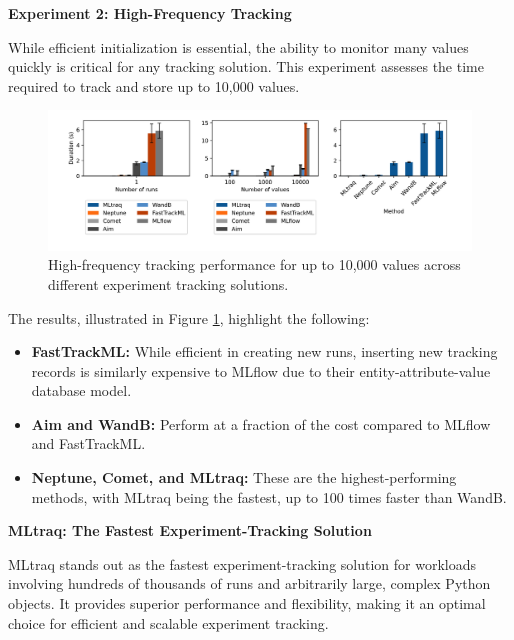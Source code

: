 \textbf{Experiment 2: High-Frequency Tracking}

While efficient initialization is essential, the ability to monitor many values quickly is critical for any tracking solution. This experiment assesses the time required to track and store up to 10,000 values.

\begin{figure}[h!]
    \centering
    \includegraphics[width=\textwidth]{images/mltraq/mltraq-high-frequency.png}
    \caption{High-frequency tracking performance for up to 10,000 values across different experiment tracking solutions.}
    \label{fig:high-freq}
\end{figure}

The results, illustrated in Figure \ref{fig:high-freq}, highlight the following:

\begin{itemize}
    \item \textbf{FastTrackML:} While efficient in creating new runs, inserting new tracking records is similarly expensive to MLflow due to their entity-attribute-value database model.
    \item \textbf{Aim and WandB:} Perform at a fraction of the cost compared to MLflow and FastTrackML.
    \item \textbf{Neptune, Comet, and MLtraq:} These are the highest-performing methods, with MLtraq being the fastest, up to 100 times faster than WandB.
\end{itemize}

\textbf{MLtraq: The Fastest Experiment-Tracking Solution}

MLtraq stands out as the fastest experiment-tracking solution for workloads involving hundreds of thousands of runs and arbitrarily large, complex Python objects. It provides superior performance and flexibility, making it an optimal choice for efficient and scalable experiment tracking.

